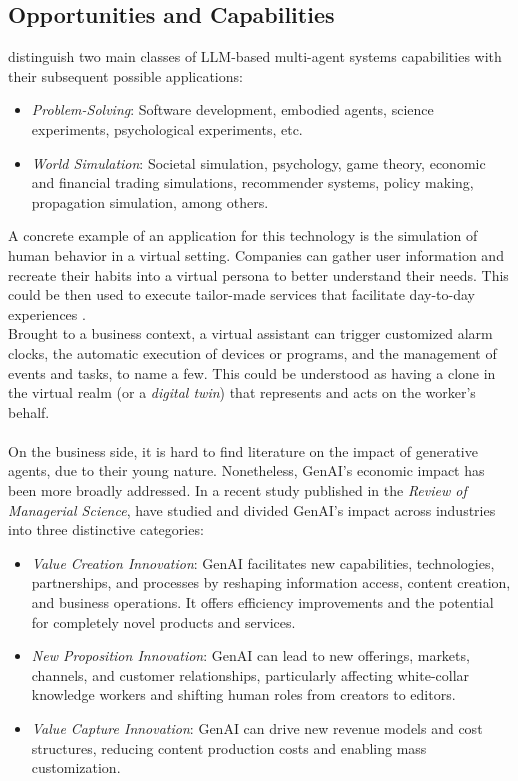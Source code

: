 \subsection{Opportunities and Capabilities}
\textcite[pp. 5-10]{guo_large_2024} distinguish two main classes of LLM-based multi-agent systems capabilities with their subsequent possible applications:
\begin{itemize}
    \item \textit{Problem-Solving}: Software development, embodied agents, science experiments, psychological experiments, etc.
    \item \textit{World Simulation}: Societal simulation, psychology, game theory, economic and financial trading simulations, recommender systems, policy making, propagation simulation, among others.
\end{itemize}
A concrete example of an application for this technology is the simulation of human behavior in a virtual setting. Companies can gather user information and recreate their habits into a virtual persona to better understand their needs. This could be then used to execute tailor-made services that facilitate day-to-day experiences \parencite[cf.][p. 17]{Park.07.04.2023}. \\
Brought to a business context, a virtual assistant can trigger customized alarm clocks, the automatic execution of devices or programs, and the management of events and tasks, to name a few. This could be understood as having a clone in the virtual realm (or a \textit{digital twin}) that represents and acts on the worker's behalf.\\\\
On the business side, it is hard to find literature on the impact of generative agents, due to their young nature. Nonetheless, GenAI's economic impact has been more broadly addressed. In a recent study published in the \textit{Review of Managerial Science}, \textcite[pp. 1211-1213]{kanbach_genai_2024} have studied and divided GenAI's impact across industries into three distinctive categories:
\begin{itemize}
    \item \textit{Value Creation Innovation}: GenAI facilitates new capabilities, technologies, partnerships, and processes by reshaping information access, content creation, and business operations. It offers efficiency improvements and the potential for completely novel products and services.
    \item \textit{New Proposition Innovation}: GenAI can lead to new offerings, markets, channels, and customer relationships, particularly affecting white-collar knowledge workers and shifting human roles from creators to editors.
    \item \textit{Value Capture Innovation}: GenAI can drive new revenue models and cost structures, reducing content production costs and enabling mass customization.
\end{itemize}
